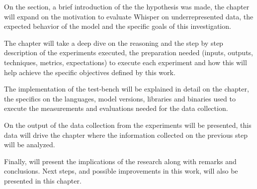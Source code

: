 On the  section, a brief introduction of the the hypothesis was made, the  chapter will expand on the motivation to evaluate Whisper on underrepresented data, the expected behavior of the model and the specific goals of this investigation.


The  chapter will take a deep dive on the reasoning and the step by step description of the experiments executed, the preparation needed (inputs, outputs, techniques, metrics, expectations) to execute each experiment and how this will help achieve the specific objectives defined by this work.

The implementation of the test-bench will be explained in detail on the  chapter, the specifics on the languages, model versions, libraries and binaries used to execute the measurements and evaluations needed for the data collection.


On  the output of the data collection from the experiments will be presented, this data will drive the  chapter where the information collected on the previous step will be analyzed.

Finally,  will present the implications of the research along with remarks and conclusions. Next steps, and possible improvements in this work, will also be presented in this chapter.





